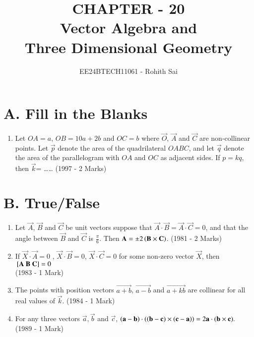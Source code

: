 \documentclass[journal]{IEEEtran}
\begin{document}

\vspace{3cm}

\title{CHAPTER - 20\\Vector Algebra and\\Three Dimensional Geometry}
\author{EE24BTECH11061 - Rohith Sai}
\maketitle

\renewcommand{\thefigure}{\theenumi}
\renewcommand{\thetable}{\theenumi}

\section{A. Fill in the Blanks}
\begin{enumerate}
\item Let $OA=a$, $OB = 10a + 2b$ and $OC =b$ where $\vec{O}$, $\vec{A}$ and $\vec{C}$ are non-collinear points. Let $\vec{p}$ denote the area of the quadrilateral $OABC$, and let $\vec{q}$ denote the area of the parallelogram with $OA$ and $OC$ as adjacent sides. If $p=kq$, then $\vec{k}$= \dots\dots
\hfill (1997 - 2 Marks)
\end{enumerate}

\section{B. True/False}
\begin{enumerate}
\item Let $\vec{A}$, $\vec{B}$ and $\vec{C}$ be unit vectors suppose that $\vec{A}\cdot\vec{B} = \vec{A}\cdot\vec{C}=0$, and that the angle between $\vec{B}$ and $\vec{C}$ is $\frac{\pi}{6}$. Then $\mathbf{A}=\pm2\left(\mathbf{B}\times\mathbf{C}\right)$.
\hfill (1981 - 2 Marks)

\item If $\vec{X}\cdot\vec{A}=0$ , $\vec{X}\cdot\vec{B}=0$, $\vec{X}\cdot\vec{C}=0$ for some non-zero vector $\vec{X}$, then $\sbrak{\vec{A}\ \vec{B}\ \vec{C}}=0$\\
\hfill (1983 - 1 Mark)

\item The points with position vectors $\vec{a+b}$, $\vec{a-b}$ and $\vec{a+kb}$ are collinear for all real values of $\vec{k}$.
\hfill (1984 - 1 Mark)

\item For any three vectors $\vec{a}, \vec{b}$ and $\vec{c}$, $\left(\mathbf{a}-\mathbf{b}\right)\cdot\left({\left(\mathbf{b}-\mathbf{c)}\times(\mathbf{c}-\mathbf{a}\right)}\right) = 2\mathbf{a}\cdot(\mathbf{b}\times\mathbf{c}).$\\
\hfill (1989 - 1 Mark)
\end{enumerate}
\end{document}

